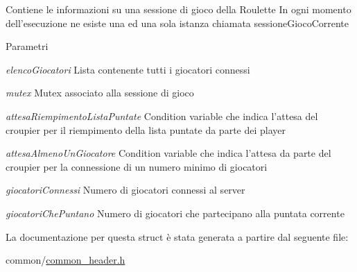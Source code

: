 Contiene le informazioni su una sessione di gioco della Roulette In ogni momento dell'esecuzione ne esiste una ed una sola istanza chiamata sessioneGiocoCorrente


\begin{DoxyParams}{Parametri}
\item[{\em elencoGiocatori}]Lista contenente tutti i giocatori connessi \item[{\em mutex}]Mutex associato alla sessione di gioco \item[{\em attesaRiempimentoListaPuntate}]Condition variable che indica l'attesa del croupier per il riempimento della lista puntate da parte dei player \item[{\em attesaAlmenoUnGiocatore}]Condition variable che indica l'attesa da parte del croupier per la connessione di un numero minimo di giocatori \item[{\em giocatoriConnessi}]Numero di giocatori connessi al server \item[{\em giocatoriChePuntano}]Numero di giocatori che partecipano alla puntata corrente \end{DoxyParams}


La documentazione per questa struct è stata generata a partire dal seguente file:\begin{DoxyCompactItemize}
\item 
common/\hyperlink{common__header_8h}{common\_\-header.h}\end{DoxyCompactItemize}
